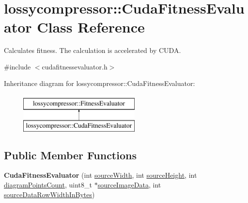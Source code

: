 \hypertarget{classlossycompressor_1_1_cuda_fitness_evaluator}{}\section{lossycompressor\+:\+:Cuda\+Fitness\+Evaluator Class Reference}
\label{classlossycompressor_1_1_cuda_fitness_evaluator}


Calculates fitness. The calculation is accelerated by C\+U\+DA.  




{\ttfamily \#include $<$cudafitnessevaluator.\+h$>$}

Inheritance diagram for lossycompressor\+:\+:Cuda\+Fitness\+Evaluator\+:\begin{figure}[H]
\begin{center}
\leavevmode
\includegraphics[height=2.000000cm]{classlossycompressor_1_1_cuda_fitness_evaluator}
\end{center}
\end{figure}
\subsection*{Public Member Functions}
\begin{DoxyCompactItemize}
\item 
{\bfseries Cuda\+Fitness\+Evaluator} (int \hyperlink{classlossycompressor_1_1_fitness_evaluator_ab24b1f451eece3d50d030145bdb806f7}{source\+Width}, int \hyperlink{classlossycompressor_1_1_fitness_evaluator_a22151a860849a3b8d0d9d3e2f3b46bdf}{source\+Height}, int \hyperlink{classlossycompressor_1_1_fitness_evaluator_aed694c851ddd4648513cd9c249654272}{diagram\+Points\+Count}, uint8\+\_\+t $\ast$\hyperlink{classlossycompressor_1_1_fitness_evaluator_af75273c5e267ab03a3f3f86c7b043a52}{source\+Image\+Data}, int \hyperlink{classlossycompressor_1_1_fitness_evaluator_a09bd546107e628d4e9e5ff57f078bccf}{source\+Data\+Row\+Width\+In\+Bytes})\hypertarget{classlossycompressor_1_1_cuda_fitness_evaluator_a90dc58cd5a34647f0d90df10fcfea278}{}\label{classlossycompressor_1_1_cuda_fitness_evaluator_a90dc58cd5a34647f0d90df10fcfea278}

\end{DoxyCompactItemize}
